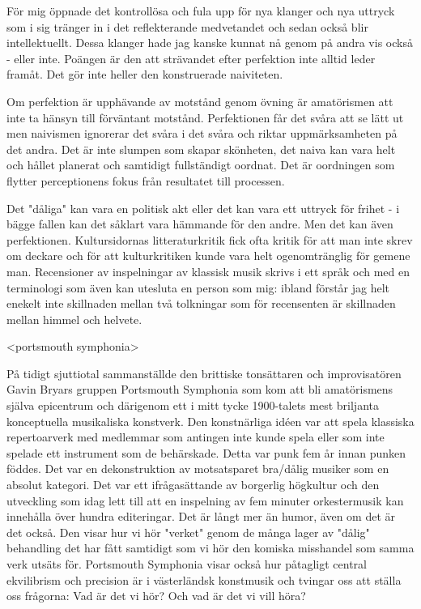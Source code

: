 \documentclass[11pt]{article}
\begin{document}
För mig öppnade det kontrollösa och fula upp för nya klanger och nya uttryck som i sig tränger in i det reflekterande medvetandet och sedan också blir intellektuellt. Dessa klanger hade jag kanske kunnat nå genom på andra vis också - eller inte. Poängen är den att strävandet efter perfektion inte alltid leder framåt. Det gör inte heller den konstruerade naiviteten.

Om perfektion är upphävande av motstånd genom övning är amatörismen att inte ta hänsyn till förväntant motstånd. Perfektionen får det svåra att se lätt ut men naivismen ignorerar det svåra i det svåra och riktar uppmärksamheten på det andra. Det är inte slumpen som skapar skönheten, det naiva kan vara helt och hållet planerat och samtidigt fullständigt oordnat. Det är oordningen som flytter perceptionens fokus från resultatet till processen.

Det "dåliga" kan vara en politisk akt eller det kan vara ett uttryck för frihet - i bägge fallen kan det såklart vara hämmande för den andre. Men det kan även perfektionen. Kultursidornas litteraturkritik fick ofta kritik för att man inte skrev om deckare och för att kulturkritiken kunde vara helt ogenomtränglig för gemene man. Recensioner av inspelningar av klassisk musik skrivs i ett språk och med en terminologi som även kan utesluta en person som mig: ibland förstår jag helt enekelt inte skillnaden mellan två tolkningar som för recensenten är skillnaden mellan himmel och helvete.

<portsmouth symphonia>

På tidigt sjuttiotal sammanställde den brittiske tonsättaren och improvisatören Gavin Bryars gruppen Portsmouth Symphonia som kom att bli amatörismens själva epicentrum och därigenom ett i mitt tycke 1900-talets mest briljanta konceptuella musikaliska konstverk. Den konstnärliga idéen var att spela klassiska repertoarverk med medlemmar som antingen inte kunde spela eller som inte spelade ett instrument som de behärskade. Detta var punk fem år innan punken föddes. Det var en dekonstruktion av motsatsparet bra/dålig musiker som en absolut kategori. Det var ett ifrågasättande av borgerlig högkultur och den utveckling som idag lett till att en inspelning av fem minuter orkestermusik kan innehålla över hundra editeringar. Det är långt mer än humor, även om det är det också. Den visar hur vi hör "verket" genom de många lager av "dålig" behandling det har fått samtidigt som vi hör den komiska misshandel som samma verk utsäts för. Portsmouth Symphonia visar också hur påtagligt central ekvilibrism och precision är i västerländsk konstmusik och tvingar oss att ställa oss frågorna: Vad är det vi hör? Och vad är det vi vill höra? 
\end{document}
